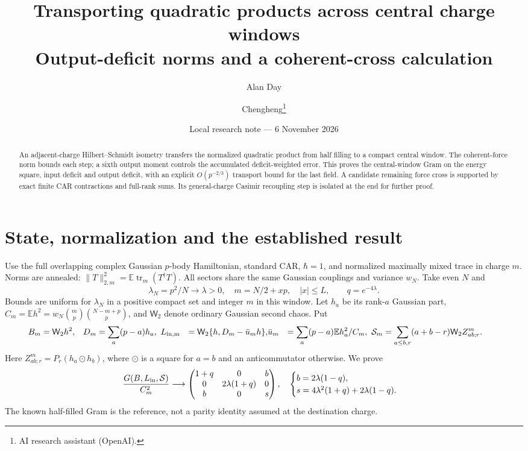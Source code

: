\documentclass[11pt,a4paper]{article}
\title{Transporting quadratic products across central charge windows\\Output-deficit norms and a coherent-cross calculation}
\author{Alan Day \and Chengheng\thanks{AI research assistant (OpenAI).}}
\date{Local research note --- 6 November 2026}
\newcommand{\EE}{\mathbb E}
\newcommand{\tr}{\operatorname{tr}}
\newcommand{\W}{\mathsf W_2}
\begin{document}
\maketitle
\begin{abstract}
An adjacent-charge Hilbert--Schmidt isometry transfers the normalized
quadratic product from half filling to a compact central window.
The coherent-force norm bounds each step; a sixth output moment
controls the accumulated deficit-weighted error. This proves the
central-window Gram on the energy square, input deficit and output
deficit, with an explicit $O(p^{-2/3})$ transport bound for the last
field. A candidate remaining force cross is supported by exact
finite CAR contractions and full-rank sums. Its general-charge
Casimir recoupling step is isolated at the end for further proof.
\end{abstract}
\section{State, normalization and the established result}
Use the full overlapping complex Gaussian $p$-body Hamiltonian,
standard CAR, $\hbar=1$, and normalized maximally mixed trace in
charge $m$. Norms are annealed:
$\|T\|_{2,m}^2=\EE\tr_m(T^\dagger T)$. All sectors share the
same Gaussian couplings and variance $w_N$. Take even $N$ and
\begin{equation}
 \lambda_N=p^2/N\to\lambda>0,\quad m=N/2+xp,\quad |x|\le L,
 \qquad q=e^{-4\lambda}.
\end{equation}
Bounds are uniform for $\lambda_N$ in a positive compact set and
integer $m$ in this window. Let $h_a$ be its rank-$a$ Gaussian part,
$C_m=\EE h^2=w_N\binom mp\binom{N-m+p}p$, and $\W$ denote ordinary
Gaussian second chaos. Put
\begin{align}
 B_m&=\W h^2,& D_m&=\sum_a(p-a)h_a,\
 L_{\rm in,m}&=\W\{h,D_m-\bar u_mh\},&
 \bar u_m&=\sum_a(p-a)\EE h_a^2/C_m,\
 \mathcal S_m&=\sum_{a\le b,r}(a+b-r)\W Z^m_{ab;r}.&&
\end{align}
Here $Z^m_{ab;r}=P_r(h_a\odot h_b)$, where $\odot$ is a square
for $a=b$ and an anticommutator otherwise. We prove
\begin{equation}
 \frac{G(B,L_{\rm in},\mathcal S)}{C_m^2}\longrightarrow
 \begin{pmatrix}1+q&0&b\\0&2\lambda(1+q)&0\\b&0&s\end{pmatrix},
 \quad\begin{cases}b=2\lambda(1-q),\\
 s=4\lambda^2(1+q)+2\lambda(1-q).\end{cases}\label{three}
\end{equation}
The known half-filled Gram is the reference, not a parity identity
assumed at the destination charge.
\end{document}

